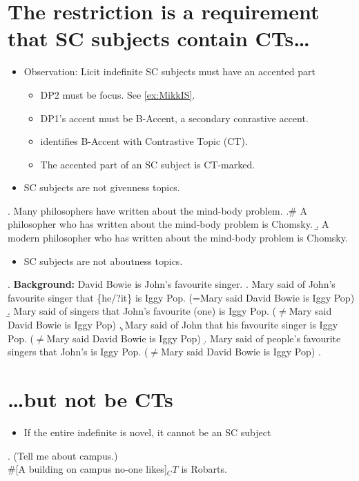 \documentclass[GPFinal]{subfiles}
\begin{document}
\section{The restriction is a requirement that SC subjects contain CTs\ldots}
\begin{itemize}
  \item Observation: Licit indefinite SC subjects must have an accented part
    \begin{itemize}
      \item DP2 must be focus. See \ref{ex:MikkIS}.
      \item DP1's accent must be  B-Accent, a secondary conrastive accent.
      \item \textcite{buring2003d} identifies B-Accent with Contrastive Topic (CT).
      \item The accented part of an SC subject is CT-marked.
    \end{itemize}
  \item SC subjects are not givenness topics.
\end{itemize}
\ex. Many philosophers have written about the mind-body problem.
\a.\# A philosopher who has written about the mind-body problem is Chomsky.
\b. A modern philosopher who has written about the mind-body problem is Chomsky.

\begin{itemize}
  \item SC subjects are not aboutness topics.
\end{itemize}
\ex. \textbf{Background:} David Bowie is John's favourite singer.
\a. Mary said of John's favourite singer that \{he/?it\} is Iggy Pop. (=Mary said David Bowie is Iggy Pop)
\b. Mary said of singers that John's favourite (one) is Iggy Pop. ($\neq$Mary said David Bowie is Iggy Pop)
\c. Mary said of John that his favourite singer is Iggy Pop. ($\neq$Mary said David Bowie is Iggy Pop)
\d. Mary said of people's favourite singers that John's is Iggy Pop. ($\neq$Mary said David Bowie is Iggy Pop)
\z.

\section{\ldots but not be CTs}
\begin{itemize}
  \item If the entire indefinite is novel, it cannot be an SC subject
\end{itemize}
\ex. (Tell me about campus.)\\
\#[A building on campus no-one likes]$_CT$ is Robarts.
\end{document}
